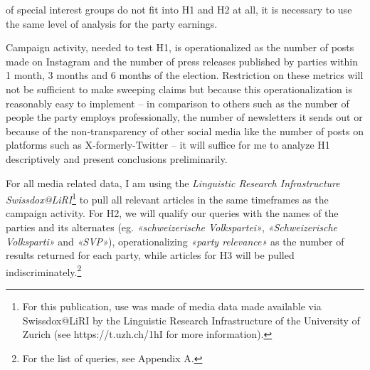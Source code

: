 \documentclass[11pt,a4paper]{article}
\begin{document}
of special interest groups do not fit into H1 and H2 at all, it is necessary to use the same level of analysis for the party earnings.

Campaign activity, needed to test H1, is operationalized as the number of posts made on Instagram and the number of press releases published by parties within 1 month, 3 months and 6 months of the election. Restriction on these metrics will not be sufficient to make sweeping claims but because this operationalization is reasonably easy to implement – in comparison to others such as the number of people the party employs professionally, the number of newsletters it sends out or because of the non-transparency of other social media like the number of posts on platforms such as X-formerly-Twitter – it will suffice for me to analyze H1 descriptively and present conclusions preliminarily.

For all media related data, I am using the \textit{Linguistic Research Infrastructure Swissdox@LiRI}\footnote{For this publication, use was made of media data made available via Swissdox@LiRI by the Linguistic Research Infrastructure of the University of Zurich (see https://t.uzh.ch/1hI for more information).} to pull all relevant articles in the same timeframes as the campaign activity. For H2, we will qualify our queries with the names of the parties and its alternates (eg. \textit{«schweizerische Volkspartei»}, \textit{«Schweizerische Volksparti»} and \textit{«SVP»}), operationalizing \textit{«party relevance»} as the number of results returned for each party, while articles for H3 will be pulled indiscriminately.\footnote{For the list of queries, see Appendix A.}
\end{document}
